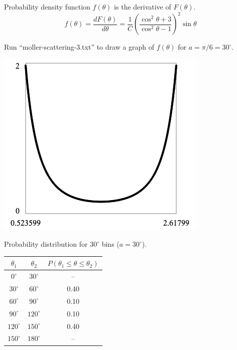 \documentclass[12pt]{article}
\begin{document}
\noindent
Probability density function $f(\theta)$ is the derivative of $F(\theta)$.
\begin{equation*}
f(\theta)
=\frac{dF(\theta)}{d\theta}
=\frac{1}{C}
\left(
\frac{\cos^2\theta+3}{\cos^2\theta-1}
\right)^2
\sin\theta
\end{equation*}

\noindent
Run ``moller-scattering-3.txt'' to draw a graph of $f(\theta)$ for $a=\pi/6=30^\circ$.

\begin{center}
\includegraphics[scale=0.5]{moller-scattering.png}
\end{center}

\noindent
Probability distribution for $30^\circ$ bins ($a=30^\circ$).
\begin{center}
\begin{tabular}{|c|c|c|}
\hline
$\theta_1$ & $\theta_2$ & $P(\theta_1\le\theta\le\theta_2)$\\
\hline
$0^\circ$ & $30^\circ$ & -- \\
$30^\circ$ & $60^\circ$ & 0.40 \\
$60^\circ$ & $90^\circ$ & 0.10 \\
$90^\circ$ & $120^\circ$ & 0.10 \\
$120^\circ$ & $150^\circ$ & 0.40 \\
$150^\circ$ & $180^\circ$ & -- \\
\hline
\end{tabular}
\end{center}
\end{document}
